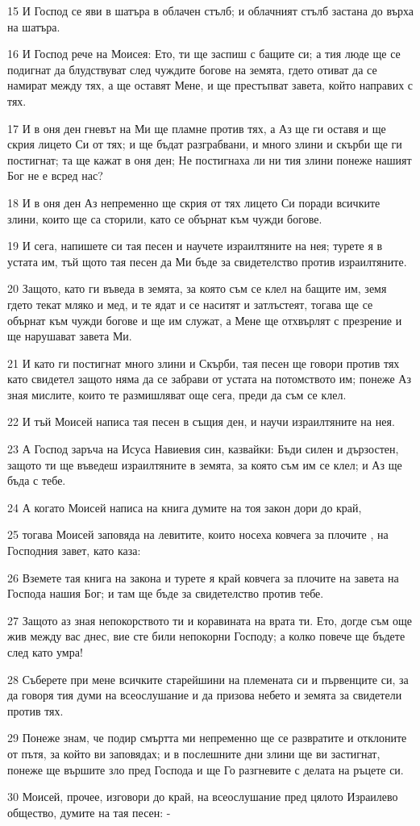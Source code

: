 \par 15 И Господ се яви в шатъра в облачен стълб; и облачният стълб застана до върха на шатъра.
\par 16 И Господ рече на Моисея: Ето, ти ще заспиш с бащите си; а тия люде ще се подигнат да блудствуват след чуждите богове на земята, гдето отиват да се намират между тях, а ще оставят Мене, и ще престъпват завета, който направих с тях.
\par 17 И в оня ден гневът на Ми ще пламне против тях, а Аз ще ги оставя и ще скрия лицето Си от тях; и ще бъдат разграбвани, и много злини и скърби ще ги постигнат; та ще кажат в оня ден; Не постигнаха ли ни тия злини понеже нашият Бог не е всред нас?
\par 18 И в оня ден Аз непременно ще скрия от тях лицето Си поради всичките злини, които ще са сторили, като се обърнат към чужди богове.
\par 19 И сега, напишете си тая песен и научете израилтяните на нея; турете я в устата им, тъй щото тая песен да Ми бъде за свидетелство против израилтяните.
\par 20 Защото, като ги въведа в земята, за която съм се клел на бащите им, земя гдето текат мляко и мед, и те ядат и се наситят и затлъстеят, тогава ще се обърнат към чужди богове и ще им служат, а Мене ще отхвърлят с презрение и ще нарушават завета Ми.
\par 21 И като ги постигнат много злини и Скърби, тая песен ще говори против тях като свидетел защото няма да се забрави от устата на потомството им; понеже Аз зная мислите, които те размишляват още сега, преди да съм се клел.
\par 22 И тъй Моисей написа тая песен в същия ден, и научи израилтяните на нея.
\par 23 А Господ заръча на Исуса Навиевия син, казвайки: Бъди силен и дързостен, защото ти ще въведеш израилтяните в земята, за която съм им се клел; и Аз ще бъда с тебе.
\par 24 А когато Моисей написа на книга думите на тоя закон дори до край,
\par 25 тогава Моисей заповяда на левитите, които носеха ковчега за плочите , на Господния завет, като каза:
\par 26 Вземете тая книга на закона и турете я край ковчега за плочите на завета на Господа нашия Бог; и там ще бъде за свидетелство против тебе.
\par 27 Защото аз зная непокорството ти и коравината на врата ти. Ето, догде съм още жив между вас днес, вие сте били непокорни Господу; а колко повече ще бъдете след като умра!
\par 28 Съберете при мене всичките старейшини на племената си и първенците си, за да говоря тия думи на всеослушание и да призова небето и земята за свидетели против тях.
\par 29 Понеже знам, че подир смъртта ми непременно ще се развратите и отклоните от пътя, за който ви заповядах; и в послешните дни злини ще ви застигнат, понеже ще вършите зло пред Господа и ще Го разгневите с делата на ръцете си.
\par 30 Моисей, прочее, изговори до край, на всеослушание пред цялото Израилево общество, думите на тая песен: -

